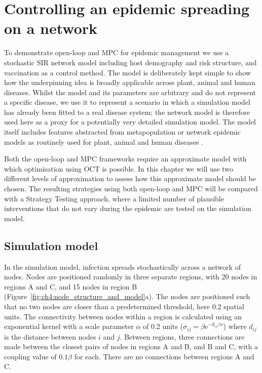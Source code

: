 \section{Controlling an epidemic spreading on a network}
\label{sec:ch4:Controlling}

To demonstrate open-loop and MPC for epidemic management we use a stochastic SIR network model including host demography and risk structure, and vaccination as a control method. The model is deliberately kept simple to show how the underpinning idea is broadly applicable across plant, animal and human diseases. Whilst the model and its parameters are arbitrary and do not represent a specific disease, we use it to represent a scenario in which a simulation model has already been fitted to a real disease system; the network model is therefore used here as a proxy for a potentially very detailed simulation model. The model itself includes features abstracted from metapopulation or network epidemic models as routinely used for plant, animal and human diseases \citep{rowthorn_optimal_2009, keeling_dynamics_2001, keeling_metapopulation_2000, margosian_connectivity_2009, bansal_individual_2007}.

Both the open-loop and MPC frameworks require an approximate model with which optimisation using OCT is possible. In this chapter we will use two different levels of approximation to assess how this approximate model should be chosen. The resulting strategies using both open-loop and MPC will be compared with a Strategy Testing approach, where a limited number of plausible interventions that do not vary during the epidemic are tested on the simulation model. 

\subsection{Simulation model}

In the simulation model, infection spreads stochastically across a network of nodes. Nodes are positioned randomly in three separate regions, with 20 nodes in regions A and C, and 15 nodes in region B (Figure~\ref{fig:ch4:node_structure_and_model}a). The nodes are positioned such that no two nodes are closer than a predetermined threshold, here 0.2 spatial units. The connectivity between nodes within a region is calculated using an exponential kernel with a scale parameter $\alpha$ of 0.2 units ($\sigma_{ij} = \beta\mathrm{e}^{-d_{ij}/\alpha}$) where $d_{ij}$ is the distance between nodes $i$ and $j$. Between regions, three connections are made between the closest pairs of nodes in regions A and B, and B and C, with a coupling value of $0.1\beta$ for each. There are no connections between regions A and C.

